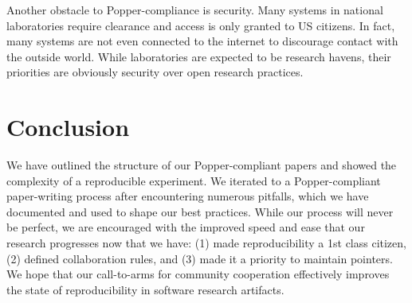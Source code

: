 Another obstacle to Popper-compliance is security. Many systems in national
laboratories require clearance and access is only granted to US citizens. In
fact, many systems are not even connected to the internet to discourage contact
with the outside world. While laboratories are expected to be research havens,
their priorities are obviously security over open research practices.

\section{Conclusion}

We have outlined the structure of our Popper-compliant papers and showed the
complexity of a reproducible experiment. We iterated to a Popper-compliant
paper-writing process after encountering numerous pitfalls, which we have
documented and used to shape our best practices. While our process will never
be perfect, we are encouraged with the improved speed and ease that our research
progresses now that we have: (1) made reproducibility a 1st class citizen, (2)
defined collaboration rules, and (3) made it a priority to maintain pointers.
We hope that our call-to-arms for community cooperation effectively improves
the state of reproducibility in software research artifacts.
